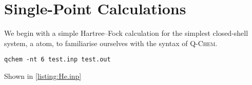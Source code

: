 \renewcommand*{\codelocation}{singlepoint/codesnippets}

\section{Single-Point Calculations}

	We begin with a simple Hartree--Fock calculation for the simplest closed-shell system, a  atom, to familiarise ourselves with the syntax of \textsc{Q-Chem}.
	
	\begin{lstlisting}[style = custombash]
		qchem -nt 6 test.inp test.out
	\end{lstlisting}
	
	
	Shown in \cref{listing:He.inp}
	
	